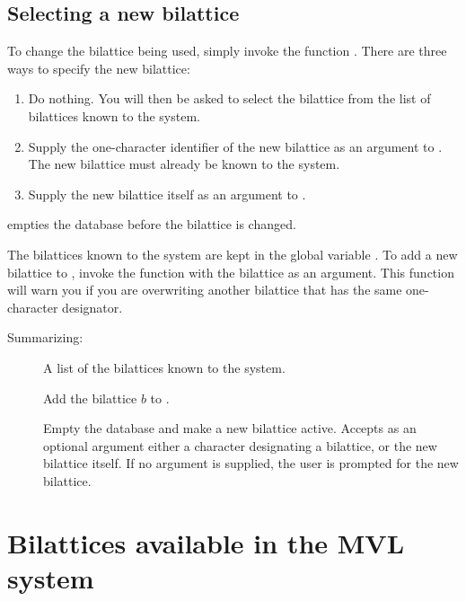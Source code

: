 \subsection{Selecting a new bilattice}
\label{s.change}

To change the bilattice being used, simply invoke the function
.  There are three ways to specify the new bilattice:
 \begin{enumerate}
 \item Do nothing.  You will then be asked to select the bilattice
from the list of bilattices known to the system.
 \item Supply the one-character identifier of the new bilattice as an
argument to .  The new bilattice must already be
known to the system.
 \item Supply the new bilattice itself as an argument to
.
 \end{enumerate}
  empties the database before the bilattice is
changed.

The bilattices known to the system are kept in the global variable
.  To add a new bilattice to ,
invoke the function  with the bilattice as an
argument.  This function will warn you if you are overwriting another
bilattice that has the same one-character designator.

Summarizing:
 \begin{description}
 \item [] A list of the bilattices known to the system.
 \item [] Add the bilattice $b$ to .
 \item [] Empty the database and make a new bilattice
active.  Accepts as an optional argument either a character designating
a bilattice, or the new bilattice itself.  If no argument is supplied,
the user is prompted for the new bilattice.
 \end{description}

\section{Bilattices available in the MVL system}

